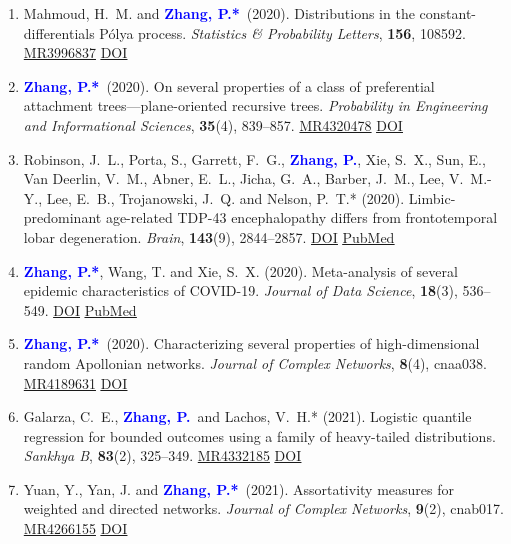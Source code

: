 \documentclass[12pt]{article}
\def\MR#1{\href{http://www.ams.org/mathscinet-getitem?mr=#1}{MR#1}}
\newcommand{\PZ}{\textcolor{blue}{\textbf{Zhang, P.*}}}
\newcommand{\PZnot}{\textcolor{blue}{\textbf{Zhang, P.}}}
\begin{document}
\begin{enumerate}
		\item {\sc Mahmoud, H.\ M.} and \PZ\ (2020). 
		Distributions in the constant-differentials P\'{o}lya process. {\em Statistics \& Probability Letters}, \textbf{156}, 108592. \MR{3996837}
		\href{https://doi.org/10.1016/j.spl.2019.108592}
		{\underline{DOI}}
		
		\item \PZ\ (2020). On several properties of a 
		class of preferential attachment trees---plane-oriented 
		recursive trees. {\em Probability in Engineering and 
		Informational Sciences}, {\bf 35}(4), 839--857. \MR{4320478}
		\href{https://doi.org/10.1017/S0269964820000261}
		{\underline{DOI}}
		
		\item {\sc Robinson, J.\ L., Porta, S., Garrett, F.\ G.}, 
		\PZnot, {\sc Xie, S.\ X., Sun, E., Van Deerlin, V.\ M., Abner, E.\ L., Jicha, G.\ A., Barber, J.\ M., Lee, V.\ M.-Y., Lee, E.\ B., Trojanowski, J.\ Q.} and {\sc Nelson, P.\ T.*} (2020). Limbic-predominant age-related TDP-43 encephalopathy differs from frontotemporal lobar degeneration. {\em Brain}, {\bf 143}(9), 
		2844--2857. \href{https://doi.org/10.1093/brain/awaa219}
		{\underline{DOI}} \href{https://pubmed.ncbi.nlm.nih.gov/32830216}
		{\underline{PubMed}}
		
		\item \PZ, {\sc Wang, T.} and {\sc Xie, S.\ X.} 
		(2020). Meta-analysis of several epidemic characteristics of COVID-19. {\em Journal of Data Science}, {\bf 18}(3), 536--549. \href{https://doi.org/10.6339/JDS.202007_18(3).0019}
		{\underline{DOI}} \href{https://pubmed.ncbi.nlm.nih.gov/33088292}
		{\underline{PubMed}}
		
		\item \PZ\ (2020). Characterizing several properties of 
		high-dimensional random Apollonian networks. {\em 
		Journal of Complex Networks}, {\bf 8}(4), cnaa038. \MR{4189631} \href{https://doi.org/10.1093/comnet/cnaa038}
		{\underline{DOI}}
		
		\item {\sc Galarza, C.\ E.}, \PZnot\	and {\sc Lachos, V.\ H.*} (2021). Logistic quantile regression for bounded outcomes using a family of heavy-tailed distributions. {\em Sankhya B}, {\bf 83}(2), 325--349. \MR{4332185} 
		\href{https://doi.org/10.1007/s13571-020-00231-0}
		{\underline{DOI}}
		
		\item {\sc Yuan, Y., Yan, J.} and \PZ\ (2021). 
		Assortativity measures for weighted and directed
		networks. \emph{Journal of Complex Networks}, {\bf 9}(2), cnab017. \MR{4266155} \href{https://doi.org/10.1093/comnet/cnab017}
		{\underline{DOI}}
		

\end{enumerate}
\end{document}
